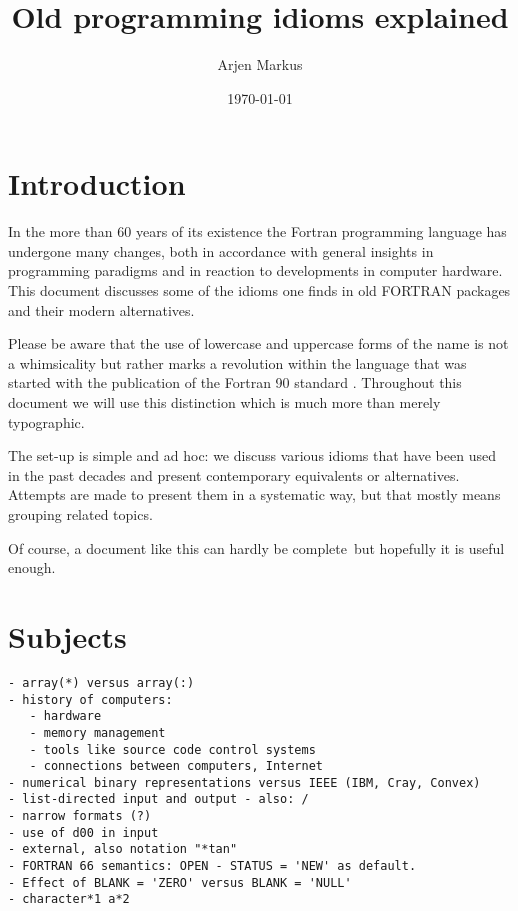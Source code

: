 \documentclass{article}
\date{\today}
\author{Arjen Markus}
\title{Old programming idioms explained}
\begin{document}
\maketitle

\tableofcontents
\newpage

\section{Introduction}
In the more than 60 years of its existence the Fortran programming
language has undergone many changes, both in accordance with general insights
in programming paradigms and in reaction to developments in computer hardware.
This document discusses some of the idioms one finds in old FORTRAN packages
and their modern alternatives.

Please be aware that the use of lowercase and uppercase forms of the name is
not a whimsicality but rather marks a revolution within the language that was
started with the publication of the Fortran 90 standard \cite{Fortran90Standard}. Throughout
this document we will use this distinction which is much more than merely
typographic.

The set-up is simple and ad hoc: we discuss various idioms that have been
used in the past decades and present contemporary equivalents or alternatives.
Attempts are made to present them in a systematic way, but that mostly means grouping
related topics.

Of course, a document like this can hardly be complete\, but hopefully it is
useful enough.












\section{Subjects}
\begin{verbatim}
- array(*) versus array(:)
- history of computers:
   - hardware
   - memory management
   - tools like source code control systems
   - connections between computers, Internet
- numerical binary representations versus IEEE (IBM, Cray, Convex)
- list-directed input and output - also: /
- narrow formats (?)
- use of d00 in input
- external, also notation "*tan"
- FORTRAN 66 semantics: OPEN - STATUS = 'NEW' as default.
- Effect of BLANK = 'ZERO' versus BLANK = 'NULL'
- character*1 a*2
\end{verbatim}
\end{document}
